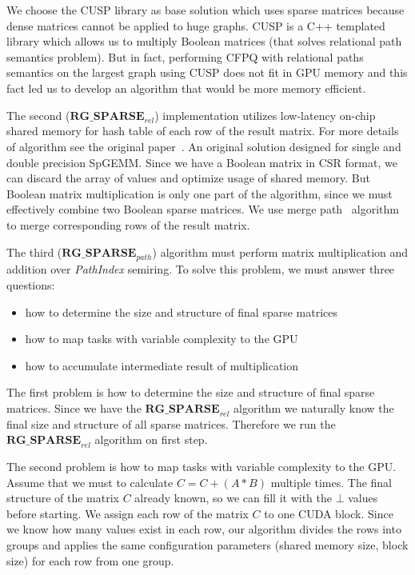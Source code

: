 We choose the CUSP library as base solution which uses sparse matrices because dense matrices cannot be applied to huge graphs. CUSP is a C++ templated library which allows us to multiply Boolean matrices (that solves relational path semantics problem). But in fact, performing CFPQ with relational paths semantics on the largest graph using CUSP does not fit in GPU memory and this fact led us to develop an algorithm that would be more memory efficient.

The second ($\textbf{RG\_SPARSE}_{rel}$) implementation utilizes low-latency on-chip shared memory for hash table of each row of the result matrix. For more details of algorithm see the original paper~\cite{NsparsePaper}. An original solution designed for single and double precision SpGEMM. Since we have a Boolean matrix in CSR format, we can discard the array of values and optimize usage of shared memory. But Boolean matrix multiplication is only one part of the algorithm, since we must effectively combine two Boolean sparse matrices. We use merge path~\cite{GpuMergePathPaper} algorithm to merge corresponding rows of the result matrix.

The third ($\textbf{RG\_SPARSE}_{path}$) algorithm must perform matrix multiplication and addition over \textit{PathIndex} semiring. To solve this problem, we must answer three questions: 

\begin{itemize}
  \item how to determine the size and structure of final sparse matrices
  \item how to map tasks with variable complexity to the GPU
  \item how to accumulate intermediate result of multiplication
\end{itemize}

The first problem is how to determine the size and structure of final sparse matrices. Since we have the $\textbf{RG\_SPARSE}_{rel}$ algorithm we naturally know the final size and structure of all sparse matrices. Therefore we run the $\textbf{RG\_SPARSE}_{rel}$ algorithm on first step.

The second problem is how to map tasks with variable complexity to the GPU. Assume that we must to calculate $C = C + (A * B)$ multiple times. The final structure of the matrix $C$ already known, so we can fill it with the $\bot$ values before starting. We assign each row of the matrix $C$ to one CUDA block. Since we know how many values exist in each row, our algorithm divides the rows into groups and applies the same configuration parameters (shared memory size, block size) for each row from one group.
 
